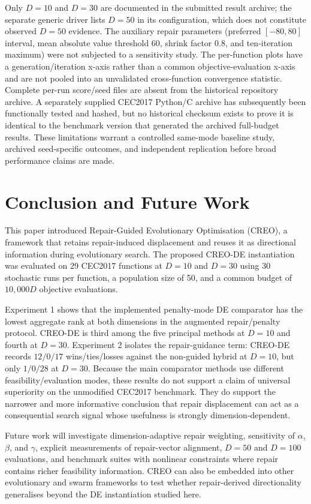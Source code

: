 \documentclass[journal]{IEEEtran}
\begin{document}
Only $D=10$ and $D=30$ are documented in the submitted result archive; the separate generic driver lists $D=50$ in its configuration, which does not constitute observed $D=50$ evidence. The auxiliary repair parameters (preferred $[-80,80]$ interval, mean absolute value threshold 60, shrink factor $0.8$, and ten-iteration maximum) were not subjected to a sensitivity study. The per-function plots have a generation/iteration x-axis rather than a common objective-evaluation x-axis and are not pooled into an unvalidated cross-function convergence statistic. Complete per-run score/seed files are absent from the historical repository archive. A separately supplied CEC2017 Python/C archive has subsequently been functionally tested and hashed, but no historical checksum exists to prove it is identical to the benchmark version that generated the archived full-budget results. These limitations warrant a controlled same-mode baseline study, archived seed-specific outcomes, and independent replication before broad performance claims are made.

\section{Conclusion and Future Work}

This paper introduced Repair-Guided Evolutionary Optimisation (CREO), a framework that retains repair-induced displacement and reuses it as directional information during evolutionary search. The proposed CREO-DE instantiation was evaluated on 29 CEC2017 functions at $D=10$ and $D=30$ using 30 stochastic runs per function, a population size of 50, and a common budget of $10{,}000D$ objective evaluations.

Experiment 1 shows that the implemented penalty-mode DE comparator has the lowest aggregate rank at both dimensions in the augmented repair/penalty protocol. CREO-DE is third among the five principal methods at $D=10$ and fourth at $D=30$. Experiment 2 isolates the repair-guidance term: CREO-DE records $12/0/17$ wins/ties/losses against the non-guided hybrid at $D=10$, but only $1/0/28$ at $D=30$. Because the main comparator methods use different feasibility/evaluation modes, these results do not support a claim of universal superiority on the unmodified CEC2017 benchmark. They do support the narrower and more informative conclusion that repair displacement can act as a consequential search signal whose usefulness is strongly dimension-dependent.

Future work will investigate dimension-adaptive repair weighting, sensitivity of $\alpha$, $\beta$, and $\gamma$, explicit measurements of repair-vector alignment, $D=50$ and $D=100$ evaluations, and benchmark suites with nonlinear constraints where repair contains richer feasibility information. CREO can also be embedded into other evolutionary and swarm frameworks to test whether repair-derived directionality generalises beyond the DE instantiation studied here.
\end{document}
